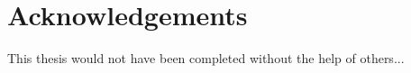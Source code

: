 \chapter*{Acknowledgements}
This thesis would not have been completed without the help of others...
